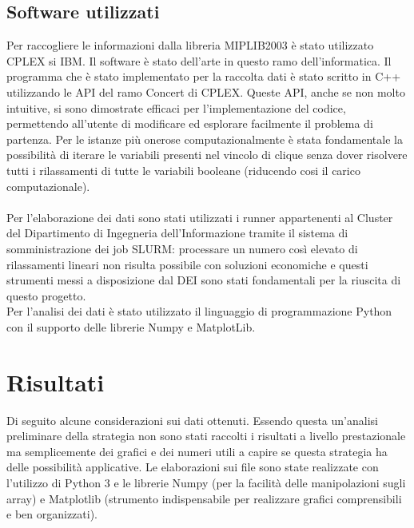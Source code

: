 \documentclass[12pt,a4paper,twoside,openright]{book}
\begin{document}
\section{Software utilizzati}
Per raccogliere le informazioni dalla libreria MIPLIB2003 è stato utilizzato CPLEX si IBM.
Il software è stato dell'arte in questo ramo dell'informatica.
Il programma che è stato implementato per la raccolta dati è stato scritto in C++ utilizzando 
le API del ramo Concert di CPLEX. Queste API, anche se non molto intuitive,
si sono dimostrate efficaci per l'implementazione del codice, permettendo all'utente di 
modificare ed esplorare facilmente il problema di partenza. Per le istanze più onerose 
computazionalmente è stata fondamentale la possibilità di iterare le variabili presenti nel
vincolo di clique senza dover risolvere tutti i rilassamenti di tutte le variabili booleane 
(riducendo cosi il carico computazionale).\\\\

Per l'elaborazione dei dati sono stati utilizzati i runner appartenenti al Cluster del Dipartimento di Ingegneria 
dell'Informazione tramite il sistema di somministrazione dei job SLURM: 
processare un numero così elevato di rilassamenti lineari non risulta possibile con soluzioni 
economiche e questi strumenti messi a disposizione dal DEI sono stati fondamentali per 
la riuscita di questo progetto.
\\
Per l'analisi dei dati è stato utilizzato il linguaggio di programmazione Python con il supporto delle 
librerie Numpy e MatplotLib.

\chapter{Risultati}
Di seguito alcune considerazioni sui dati ottenuti. Essendo questa un'analisi preliminare della strategia
non sono stati raccolti i risultati a livello prestazionale ma semplicemente dei grafici e dei numeri 
utili a capire se questa strategia ha delle possibilità applicative. Le elaborazioni sui file sono state
realizzate con l'utilizzo di Python 3 e le librerie Numpy (per la facilità delle manipolazioni sugli array)
e Matplotlib (strumento indispensabile per realizzare grafici comprensibili e ben organizzati).
\end{document}
